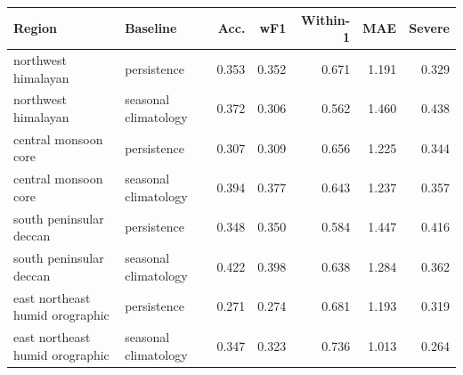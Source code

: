 \begin{tabular}{llrrrrr}\toprule
Region & Baseline & Acc. & wF1 & Within-1 & MAE & Severe \\
\midrule
northwest himalayan & persistence & 0.353 & 0.352 & 0.671 & 1.191 & 0.329 \\
northwest himalayan & seasonal climatology & 0.372 & 0.306 & 0.562 & 1.460 & 0.438 \\
central monsoon core & persistence & 0.307 & 0.309 & 0.656 & 1.225 & 0.344 \\
central monsoon core & seasonal climatology & 0.394 & 0.377 & 0.643 & 1.237 & 0.357 \\
south peninsular deccan & persistence & 0.348 & 0.350 & 0.584 & 1.447 & 0.416 \\
south peninsular deccan & seasonal climatology & 0.422 & 0.398 & 0.638 & 1.284 & 0.362 \\
east northeast humid orographic & persistence & 0.271 & 0.274 & 0.681 & 1.193 & 0.319 \\
east northeast humid orographic & seasonal climatology & 0.347 & 0.323 & 0.736 & 1.013 & 0.264 \\
\bottomrule
\end{tabular}
